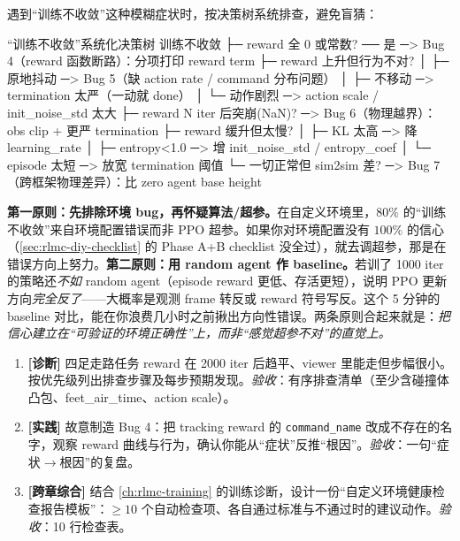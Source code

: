 遇到“训练不收敛”这种模糊症状时，按决策树系统排查，避免盲猜：

\begin{codebox}[text]{“训练不收敛”系统化决策树}
训练不收敛
├─ reward 全 0 或常数? ── 是 ─> Bug 4（reward 函数断路）：分项打印 reward term
├─ reward 上升但行为不对?
│    ├─ 原地抖动 ─> Bug 5（缺 action rate / command 分布问题）
│    ├─ 不移动   ─> termination 太严（一动就 done）
│    └─ 动作剧烈 ─> action scale / init_noise_std 太大
├─ reward N iter 后突崩(NaN)? ─> Bug 6（物理越界）：obs clip + 更严 termination
├─ reward 缓升但太慢?
│    ├─ KL 太高     ─> 降 learning_rate
│    ├─ entropy<1.0 ─> 增 init_noise_std / entropy_coef
│    └─ episode 太短 ─> 放宽 termination 阈值
└─ 一切正常但 sim2sim 差? ─> Bug 7（跨框架物理差异）：比 zero agent base height
\end{codebox}

\begin{insight}[排查的两条第一原则]\label{ins:rlmc-diy-debugprinciple}
\textbf{第一原则：先排除环境 bug，再怀疑算法/超参。}在自定义环境里，$80\%$ 的“训练不收敛”来自环境配置错误而非 PPO 超参。如果你对环境配置没有 $100\%$ 的信心（\cref{sec:rlmc-diy-checklist} 的 Phase A+B checklist 没全过），就去调超参，那是在错误方向上努力。\textbf{第二原则：用 random agent 作 baseline。}若训了 1000 iter 的策略还\emph{不如} random agent（episode reward 更低、存活更短），说明 PPO 更新方向\emph{完全反了}——大概率是观测 frame 转反或 reward 符号写反。这个 5 分钟的 baseline 对比，能在你浪费几小时之前揪出方向性错误。两条原则合起来就是：\emph{把信心建立在“可验证的环境正确性”上，而非“感觉超参不对”的直觉上。}
\end{insight}

\begin{practice}[Bug 字典]
\begin{enumerate}
\item \textbf{[诊断]} 四足走路任务 reward 在 2000 iter 后趋平、viewer 里能走但步幅很小。按优先级列出排查步骤及每步预期发现。\emph{验收}：有序排查清单（至少含碰撞体凸包、feet\_air\_time、action scale）。
\item \textbf{[实践]} 故意制造 Bug 4：把 tracking reward 的 \verb|command_name| 改成不存在的名字，观察 reward 曲线与行为，确认你能从“症状”反推“根因”。\emph{验收}：一句“症状$\to$根因”的复盘。
\item \textbf{[跨章综合]} 结合 \cref{ch:rlmc-training} 的训练诊断，设计一份“自定义环境健康检查报告模板”：$\ge 10$ 个自动检查项、各自通过标准与不通过时的建议动作。\emph{验收}：10 行检查表。
\end{enumerate}
\end{practice}

